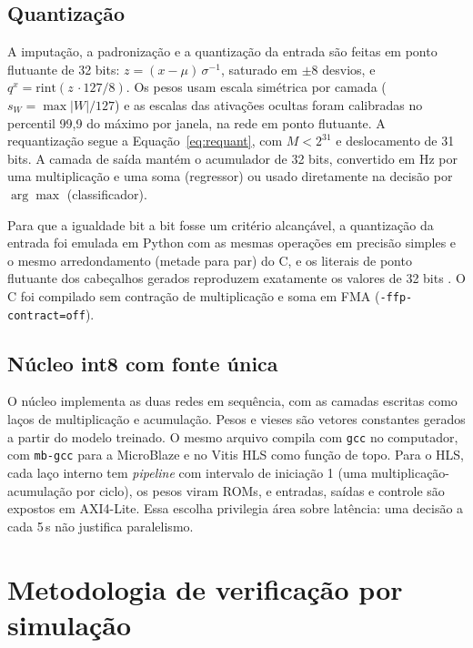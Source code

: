 \documentclass[12pt]{article}
\begin{document}
\subsection{Quantização}

A imputação, a padronização e a quantização da entrada são feitas em ponto flutuante de 32 bits: \(z = (x - \mu)\,\sigma^{-1}\), saturado em \(\pm 8\) desvios, e \(q^x = \mathrm{rint}(z\, \cdot 127/8)\). Os pesos usam escala simétrica por camada (\(s_W = \max|W|/127\)) e as escalas das ativações ocultas foram calibradas no percentil 99,9 do máximo por janela, na rede em ponto flutuante. A requantização segue a Equação~\eqref{eq:requant}, com \(M < 2^{31}\) e deslocamento de 31 bits. A camada de saída mantém o acumulador de 32 bits, convertido em Hz por uma multiplicação e uma soma (regressor) ou usado diretamente na decisão por \(\arg\max\) (classificador).

Para que a igualdade bit a bit fosse um critério alcançável, a quantização da entrada foi emulada em Python com as mesmas operações em precisão simples e o mesmo arredondamento (metade para par) do C, e os literais de ponto flutuante dos cabeçalhos gerados reproduzem exatamente os valores de 32 bits \cite{goldberg1991,ieee754}. O C foi compilado sem contração de multiplicação e soma em FMA (\texttt{-ffp-contract=off}).

\subsection{Núcleo int8 com fonte única}

O núcleo implementa as duas redes em sequência, com as camadas escritas como laços de multiplicação e acumulação. Pesos e vieses são vetores constantes gerados a partir do modelo treinado. O mesmo arquivo compila com \texttt{gcc} no computador, com \texttt{mb-gcc} para a MicroBlaze e no Vitis HLS como função de topo. Para o HLS, cada laço interno tem \textit{pipeline} com intervalo de iniciação 1 (uma multiplicação-acumulação por ciclo), os pesos viram ROMs, e entradas, saídas e controle são expostos em AXI4-Lite. Essa escolha privilegia área sobre latência: uma decisão a cada 5\,s não justifica paralelismo.

\section{Metodologia de verificação por simulação}
\label{sec:verificacao}
\end{document}
